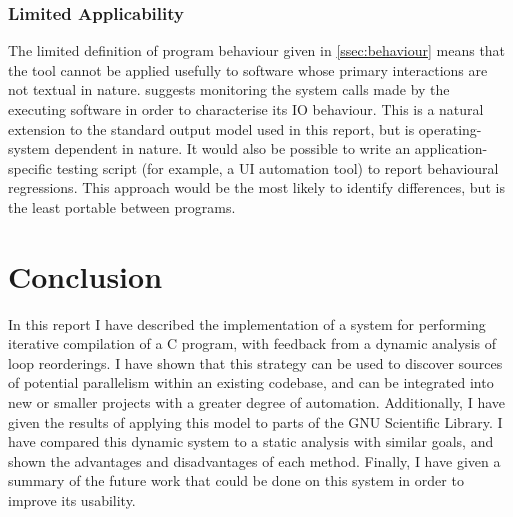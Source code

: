 \documentclass[journal]{IEEEtran}
\begin{document}
\subsubsection{Limited Applicability} The limited definition of program
behaviour given in \autoref{ssec:behaviour} means that the tool cannot be
applied usefully to software whose primary interactions are not textual in
nature. \textcite{layton_io_2010} suggests monitoring the system calls made by
the executing software in order to characterise its IO behaviour. This is a
natural extension to the standard output model used in this report, but is
operating-system dependent in nature. It would also be possible to write an
application-specific testing script (for example, a UI automation tool) to
report behavioural regressions. This approach would be the most likely to
identify differences, but is the least portable between programs.

\section{Conclusion}

In this report I have described the implementation of a system for performing
iterative compilation of a C program, with feedback from a dynamic analysis of
loop reorderings. I have shown that this strategy can be used to discover
sources of potential parallelism within an existing codebase, and can be
integrated into new or smaller projects with a greater degree of automation.
Additionally, I have given the results of applying this model to parts of the
GNU Scientific Library. I have compared this dynamic system to a static analysis
with similar goals, and shown the advantages and disadvantages of each method.
Finally, I have given a summary of the future work that could be done on this
system in order to improve its usability.

\ifCLASSOPTIONcaptionsoff
  \newpage
\fi

\printbibliography
\end{document}
